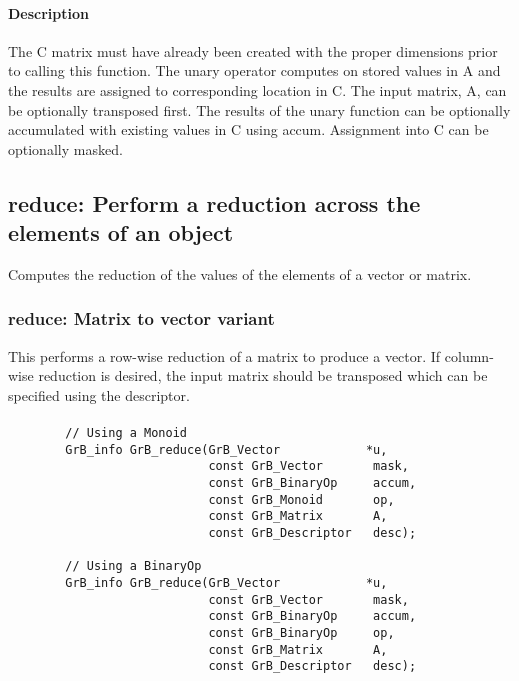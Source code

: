 \paragraph{Description}

The {\sf C} matrix must have already been created with the proper dimensions
prior to calling this function.  The unary operator computes on stored values in {\sf A} and the results are assigned to corresponding location in {\sf C}.
The input matrix, {\sf A}, can be optionally transposed first.  The results of the unary function can be optionally accumulated with existing values in {\sf C} using accum.  Assignment into {\sf C} can be optionally masked.


\subsection{{\sf reduce}: Perform a reduction across the elements of an object}

Computes the reduction of the values of the elements of a vector or matrix.

\subsubsection{{\sf reduce}: Matrix to vector variant}

This performs a row-wise reduction of a matrix to produce a vector.  If column-wise reduction
is desired, the input matrix should be transposed which can be specified using the descriptor.

\paragraph{\syntax}

\begin{verbatim}
        // Using a Monoid
        GrB_info GrB_reduce(GrB_Vector            *u,
                            const GrB_Vector       mask,
                            const GrB_BinaryOp     accum,
                            const GrB_Monoid       op,  
                            const GrB_Matrix       A,
                            const GrB_Descriptor   desc);
                            
        // Using a BinaryOp
        GrB_info GrB_reduce(GrB_Vector            *u,
                            const GrB_Vector       mask,
                            const GrB_BinaryOp     accum,
                            const GrB_BinaryOp     op,  
                            const GrB_Matrix       A,
                            const GrB_Descriptor   desc);
\end{verbatim}

